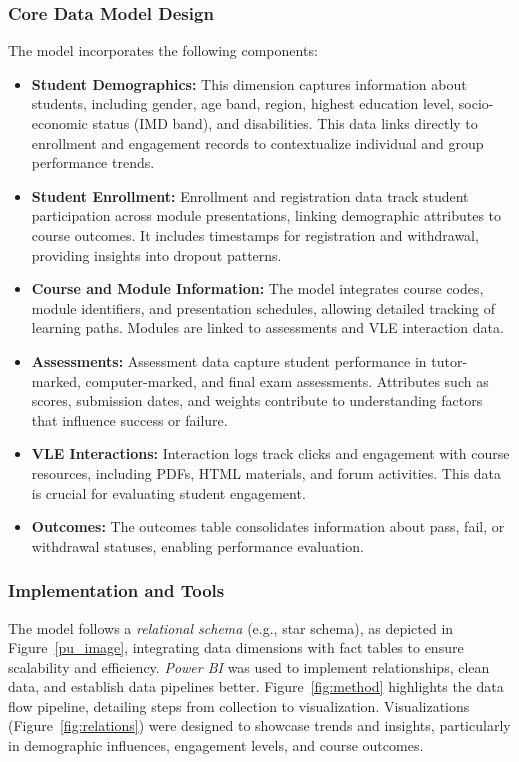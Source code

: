 \subsubsection{Core Data Model Design}
The model incorporates the following components:
\begin{itemize}
    \item \textbf{Student Demographics:} This dimension captures information about students, including gender, age band, region, highest education level, socio-economic status (IMD band), and disabilities. This data links directly to enrollment and engagement records to contextualize individual and group performance trends.
    \item \textbf{Student Enrollment:} Enrollment and registration data track student participation across module presentations, linking demographic attributes to course outcomes. It includes timestamps for registration and withdrawal, providing insights into dropout patterns.
    \item \textbf{Course and Module Information:} The model integrates course codes, module identifiers, and presentation schedules, allowing detailed tracking of learning paths. Modules are linked to assessments and VLE interaction data.
    \item \textbf{Assessments:} Assessment data capture student performance in tutor-marked, computer-marked, and final exam assessments. Attributes such as scores, submission dates, and weights contribute to understanding factors that influence success or failure.
    \item \textbf{VLE Interactions:} Interaction logs track clicks and engagement with course resources, including PDFs, HTML materials, and forum activities. This data is crucial for evaluating student engagement.
    \item \textbf{Outcomes:} The outcomes table consolidates information about pass, fail, or withdrawal statuses, enabling performance evaluation.
\end{itemize}

\subsubsection{Implementation and Tools}
The model follows a \textit{relational schema} (e.g., star schema), as depicted in Figure~\ref{pu_image}, integrating data dimensions with fact tables to ensure scalability and efficiency. \textit{Power BI} was used to implement relationships, clean data, and establish data pipelines better. Figure~\ref{fig:method} highlights the data flow pipeline, detailing steps from collection to visualization. Visualizations (Figure~\ref{fig:relations}) were designed to showcase trends and insights, particularly in demographic influences, engagement levels, and course outcomes.

